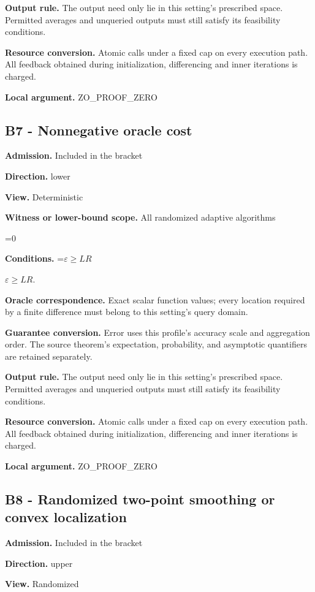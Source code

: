 \documentclass[10pt,a4paper]{article}
\newcommand{\AtlasMath}[1]{\par\begingroup\centering\setbox0=\hbox{$\displaystyle #1$}\ifdim\wd0>1.4\linewidth\typeout{ATLAS WIDE FORMULA: \the\wd0}\fi\ifdim\wd0>\linewidth\resizebox{\linewidth}{!}{\box0}\else\box0\fi\par\endgroup}
\newcommand{\AtlasInlineMath}[1]{\begingroup\setbox0=\hbox{$#1$}\ifdim\wd0>.4\linewidth\endgroup\AtlasMath{#1}\else\endgroup$#1$\fi}
\begin{document}
\textbf{Output rule.} The output need only lie in this setting's prescribed space. Permitted averages and unqueried outputs must still satisfy its feasibility conditions.

\textbf{Resource conversion.} Atomic calls under a fixed cap on every execution path. All feedback obtained during initialization, differencing and inner iterations is charged.

\textbf{Local argument.} ZO\_\allowbreak{}PROOF\_\allowbreak{}ZERO

\subsection{B7 - Nonnegative oracle cost}
\textbf{Admission.} Included in the bracket

\textbf{Direction.} lower

\textbf{View.} Deterministic

\textbf{Witness or lower-bound scope.} All randomized adaptive algorithms

\AtlasMath{0}
\textbf{Conditions.} \AtlasInlineMath{\varepsilon\ge LR}.

\textbf{Oracle correspondence.} Exact scalar function values; every location required by a finite difference must belong to this setting's query domain.

\textbf{Guarantee conversion.} Error uses this profile's accuracy scale and aggregation order. The source theorem's expectation, probability, and asymptotic quantifiers are retained separately.

\textbf{Output rule.} The output need only lie in this setting's prescribed space. Permitted averages and unqueried outputs must still satisfy its feasibility conditions.

\textbf{Resource conversion.} Atomic calls under a fixed cap on every execution path. All feedback obtained during initialization, differencing and inner iterations is charged.

\textbf{Local argument.} ZO\_\allowbreak{}PROOF\_\allowbreak{}ZERO

\subsection{B8 - Randomized two-point smoothing or convex localization}
\textbf{Admission.} Included in the bracket

\textbf{Direction.} upper

\textbf{View.} Randomized
\end{document}
